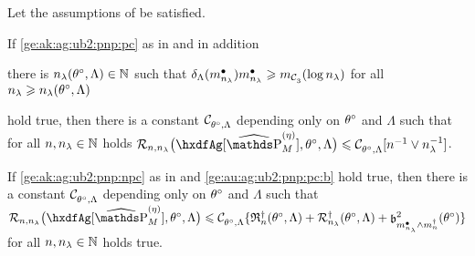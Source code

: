 \begin{cor}\label{ge:au:ag:ub2:pnp}
  Let the assumptions of  be satisfied.
  \begin{Liste}[]
  \item[\mylabel{ge:au:ag:ub2:pnp:p}{\dgrau\bfseries{(p)}}]
    If \ref{ge:ak:ag:ub2:pnp:pc} as in  and 
    in addition
    \begin{inparaenum}%
    \item[\mylabel{ge:au:ag:ub2:pnp:pc:b}{{\dgrau\bfseries(A4)}}]
            there is $\ssE(\xdf,\Lambda)\in\Nz$ such that
      $\cmiSv[\sDi{\ssE}]\sDi{\ssE}\geq \Di_{\cst{3}}(\log\ssE)$ for all
      $\ssE\geq \ssE(\xdf,\Lambda)$ 
    \end{inparaenum}
    hold true, then there is a constant $\cst{\xdf,\Lambda}$ depending
    only on $\xdf$ and $\Lambda$ such that for all $\ssY,\ssE\in\Nz$ holds
    $\nmRi{\hxdfAg[{\erWe[]}]}{\xdf,\Lambda} \leq
    \cst{\xdf,\Lambda}[\ssY^{-1}\vee\ssE^{-1}]$.
  \item[\mylabel{ge:au:ag:ub2:pnp:np}{\dgrau\bfseries{(np)}}]
    If  \ref{ge:ak:ag:ub2:pnp:npc} as in  and \ref{ge:au:ag:ub2:pnp:pc:b}
    hold true, then there is a constant $\cst{\xdf,\Lambda}$ depending
    only on $\xdf$ and $\Lambda$ such that $\nmRi{\hxdfAg[{\erWe[]}]}{\xdf,\Lambda}
    \leq \cst{\xdf,\Lambda}\{\naRa{(\xdf,\Lambda)}+\mRa{\xdf,\Lambda}+\bias[\sDi{\ssE}\wedge\aDi{\ssY}]^2(\xdf)\}$ for all $\ssY,\ssE\in\Nz$ holds true.
  \end{Liste}  
\end{cor}
